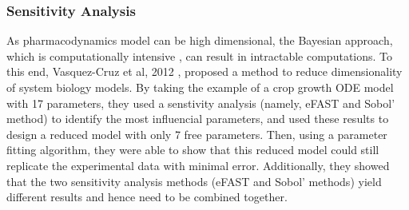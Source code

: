 \documentclass[11pt]{article}
\begin{document}
\subsubsection{Sensitivity Analysis}
As pharmacodynamics model can be high dimensional, the Bayesian approach, which is computationally intensive \cite{revParamEst}, can result in intractable computations. To this end, Vasquez-Cruz et al, 2012 \cite{tomgro}, proposed a method to reduce dimensionality of system biology models. By taking the example of a crop growth ODE model with 17 parameters, they used a senstivity analysis (namely, eFAST and Sobol' method) to identify the most influencial parameters, and used these results to design a reduced model with only 7 free parameters. Then, using a parameter fitting algorithm, they were able to show that this reduced model could still replicate the experimental data with minimal error. Additionally, they showed that the two sensitivity analysis methods (eFAST and Sobol' methods) yield different results and hence need to be combined together.
\end{document}
